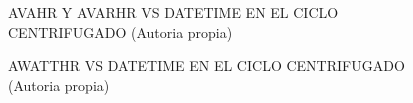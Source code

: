\begin{figure}[H]
  \hfill
  \hfill
  \hfill
  \caption{AVAHR Y AVARHR VS DATETIME EN EL CICLO CENTRIFUGADO (Autoria propia)}
  \end{figure}
\begin{figure}[H]
  \hfill
  \hfill
  \caption{AWATTHR VS DATETIME EN EL CICLO CENTRIFUGADO (Autoria propia)}
  \end{figure}
